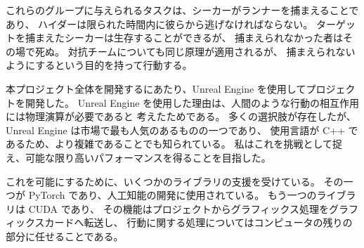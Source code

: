 \documentclass{../../Styles/AI-Research-STY}
\begin{document}
\begin{Form}
{        これらのグループに与えられるタスクは、シーカーがランナーを捕まえることであり、
        ハイダーは限られた時間内に彼らから逃げなければならない。
        ターゲットを捕まえたシーカーは生存することができるが、
        捕まえられなかった者はその場で死ぬ。
        対抗チームについても同じ原理が適用されるが、
        捕まえられないようにするという目的を持って行動する。

        本プロジェクト全体を開発するにあたり、Unreal Engine を使用してプロジェクトを開発した。
        Unreal Engine を使用した理由は、人間のような行動の相互作用には物理演算が必要であると
        考えたためである。
        多くの選択肢が存在したが、Unreal Engine は市場で最も人気のあるものの一つであり、
        使用言語が C++ であるため、より複雑であることでも知られている。
        私はこれを挑戦として捉え、可能な限り高いパフォーマンスを得ることを目指した。

        これを可能にするために、いくつかのライブラリの支援を受けている。
        その一つが PyTorch であり、人工知能の開発に使用されている。
        もう一つのライブラリは CUDA であり、
        その機能はプロジェクトからグラフィックス処理をグラフィックスカードへ転送し、
        行動に関する処理についてはコンピュータの残りの部分に任せることである。
    }



\end{Form}
\end{document}
